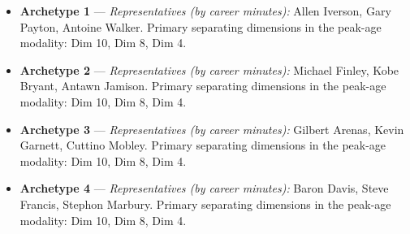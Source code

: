 \begin{itemize}
\item \textbf{Archetype 1} --- \emph{Representatives (by career minutes):} Allen Iverson, Gary Payton, Antoine Walker. Primary separating dimensions in the peak-age modality: Dim 10, Dim 8, Dim 4.
\item \textbf{Archetype 2} --- \emph{Representatives (by career minutes):} Michael Finley, Kobe Bryant, Antawn Jamison. Primary separating dimensions in the peak-age modality: Dim 10, Dim 8, Dim 4.
\item \textbf{Archetype 3} --- \emph{Representatives (by career minutes):} Gilbert Arenas, Kevin Garnett, Cuttino Mobley. Primary separating dimensions in the peak-age modality: Dim 10, Dim 8, Dim 4.
\item \textbf{Archetype 4} --- \emph{Representatives (by career minutes):} Baron Davis, Steve Francis, Stephon Marbury. Primary separating dimensions in the peak-age modality: Dim 10, Dim 8, Dim 4.
\end{itemize}
